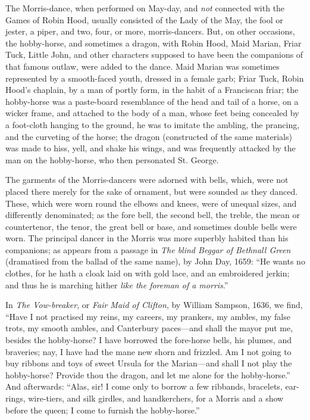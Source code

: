 The Morris-dance, when performed on May-day, and \textit{not} connected with the
Games of Robin Hood, usually consisted of the Lady of the May, the fool or jester,
a piper, and two, four, or more, morris-dancers. But, on other occasions, the hobby-horse, 
and sometimes a dragon, with Robin Hood, Maid Marian, Friar Tuck, Little 
John, and other characters supposed to have \pagebreak been the companions of that famous
outlaw, were added to the dance. Maid Marian was sometimes represented by a
smooth-faced youth, dressed in a female garb; Friar Tuck, Robin Hood’s chaplain,
by a man of portly form, in the habit of a Franciscan friar; the hobby-horse was a
paste-board resemblance of the head and tail of a horse, on a wicker frame, and
attached to the body of a man, whose feet being concealed by a foot-cloth hanging
to the ground, he was to imitate the ambling, the prancing, and the curveting of
the horse; the dragon (constructed of the same materials) was made to hiss, yell,
and shake his wings, and was frequently attacked by the man on the hobby-horse,
who then personated St. George.

The garments of the Morris-dancers were adorned with bells, which, were not
placed there merely for the sake of ornament, but were sounded as they danced.
These, which were worn round the elbows and knees, were of unequal sizes,
and differently denominated; as the fore bell, the second bell, the treble, the mean
or countertenor, the tenor, the great bell or base, and sometimes double bells were
worn.
 The principal dancer in the Morris was more superbly habited than his
companions; as appears from a passage in \textit{The blind Beggar of Bethnall Green}
(dramatised from the ballad of the same name), by John Day, 1659: “He wants
no clothes, for he hath a cloak laid on with gold lace, and an embroidered jerkin;
and thus he is marching hither \textit{like the foreman of a morris}.”

In \textit{The Vow-breaker}, or \textit{Fair Maid of Clifton}, by William Sampson, 1636,
we find, “Have I not practised my reins, my careers, my prankers, my ambles,
my false trots, my smooth ambles, and Canterbury paces—and shall the mayor
put me, besides the hobby-horse? I have borrowed the fore-horse bells, his
plumes, and braveries; nay, I have had the mane new shorn and frizzled. Am
I not going to buy ribbons and toys of sweet Ursula for the Marian—and shall
I not play the hobby-horse? Provide thou the dragon, and let me alone for the
hobby-horse.” And afterwards: “Alas, sir! I come only to borrow a few
ribbands, bracelets, ear-rings, wire-tiers, and silk girdles, and handkerchers, for a
Morris and a show before the queen; I come to furnish the hobby-horse.”

